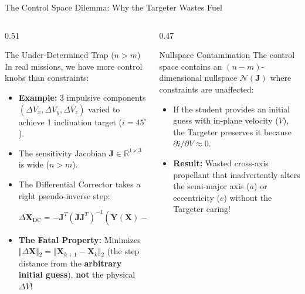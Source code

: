 \documentclass[aspectratio=169, 10pt]{beamer}
\begin{document}
\begin{frame}{The Control Space Dilemma: Why the Targeter Wastes Fuel}
    \begin{columns}[t]
        \begin{column}{0.51\textwidth}
            \begin{block}{The Under-Determined Trap ($n > m$)}
                \scriptsize
                In real missions, we have more control knobs than constraints:
                \begin{itemize}\setlength{\itemsep}{1.5pt}
                    \item \textbf{Example:} 3 impulsive components $(\Delta V_x, \Delta V_y, \Delta V_z)$ varied to achieve 1 inclination target ($i = 45^\circ$).
                    \item The sensitivity Jacobian $\mathbf{J} \in \mathbb{R}^{1 \times 3}$ is wide ($n > m$).
                    \item The Differential Corrector takes a right pseudo-inverse step:
                    \par\vspace{1pt}
                    {\centering $\displaystyle \Delta \mathbf{X}_{\text{DC}} = -\mathbf{J}^T \left(\mathbf{J} \mathbf{J}^T\right)^{-1} \left(\mathbf{Y}(\mathbf{X}) - \mathbf{Y}^*\right)$\par}
                    \vspace{1pt}
                    \item \textbf{The Fatal Property:} Minimizes $\Vert{}\Delta \mathbf{X}\Vert{}_2 = \Vert{}\mathbf{X}_{k+1} - \mathbf{X}_k\Vert{}_2$ (the step distance from the \textbf{arbitrary initial guess}), \textbf{not} the physical $\Delta V$!
                \end{itemize}
            \end{block}
        \end{column}

        \begin{column}{0.47\textwidth}
            \begin{alertblock}{Nullspace Contamination}
                \scriptsize
                The control space contains an $(n - m)$-dimensional nullspace $\mathcal{N}(\mathbf{J})$ where constraints are unaffected:
                \begin{itemize}\setlength{\itemsep}{1.5pt}
                    \item If the student provides an initial guess with in-plane velocity ($V$), the Targeter preserves it because $\partial i / \partial V \approx 0$.
                    \item \textbf{Result:} Wasted cross-axis propellant that inadvertently alters the semi-major axis ($a$) or eccentricity ($e$) without the Targeter caring!
                \end{itemize}
            \end{alertblock}


\end{column}
\end{columns}
\end{frame}
\end{document}
